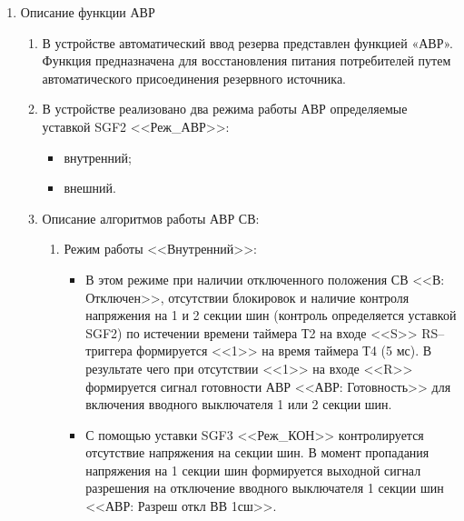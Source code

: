 
\color{black}

\begin{enumerate}


\item Описание функции АВР

\begin{enumerate}

\item
В устройстве автоматический ввод резерва представлен функцией «АВР». Функция  предназначена  для  восстановления  питания  потребителей  путем  автоматического присоединения резервного источника.

\item
В устройстве реализовано два режима работы АВР определяемые уставкой SGF2 <<Реж\_АВР>>:
\begin{itemize} 
    \item внутренний; 
    \item внешний. 
\end{itemize}

\item
Описание алгоритмов работы АВР СВ:
\begin{enumerate}[label=\arabic*), noitemsep]
    \item Режим работы <<Внутренний>>:
    \begin{itemize}
        \item  В  этом  режиме  при  наличии  отключенного  положения  СВ  <<В: Отключен>>,  отсутствии  блокировок  и  наличие  контроля  напряжения  на  1  и  2  секции  шин  (контроль определяется уставкой SGF2) по истечении времени таймера Т2 на входе <<S>> RS–триггера формируется <<1>> на время таймера Т4 (5 мс). В результате чего при отсутствии <<1>> на входе <<R>> формируется сигнал готовности АВР <<АВР: Готовность>> для включения вводного выключателя 1 или 2 секции шин. 

        \item С  помощью  уставки  SGF3 <<Реж\_КОН>> контролируется  отсутствие  напряжения  на  секции  шин.  В  момент пропадания  напряжения  на  1  секции  шин  формируется  выходной  сигнал  разрешения  на  отключение вводного выключателя 1 секции шин <<АВР: Разреш откл ВВ 1сш>>. 


\end{itemize}
\end{enumerate}
\end{enumerate}
\end{enumerate}
